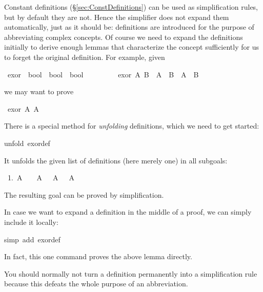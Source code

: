 \begin{isabelle}%
%
\begin{isamarkuptext}%
\noindent Constant definitions (\S\ref{sec:ConstDefinitions}) can
be used as simplification rules, but by default they are not.  Hence the
simplifier does not expand them automatically, just as it should be:
definitions are introduced for the purpose of abbreviating complex
concepts. Of course we need to expand the definitions initially to derive
enough lemmas that characterize the concept sufficiently for us to forget the
original definition. For example, given%
\end{isamarkuptext}%
\ exor\ {\isacharcolon}{\isacharcolon}\ {\isachardoublequote}bool\ {\isasymRightarrow}\ bool\ {\isasymRightarrow}\ bool{\isachardoublequote}\isanewline
\ \ \ \ \ \ \ \ \ {\isachardoublequote}exor\ A\ B\ {\isasymequiv}\ {\isacharparenleft}A\ {\isasymand}\ {\isasymnot}B{\isacharparenright}\ {\isasymor}\ {\isacharparenleft}{\isasymnot}A\ {\isasymand}\ B{\isacharparenright}{\isachardoublequote}%
\begin{isamarkuptext}%
\noindent
we may want to prove%
\end{isamarkuptext}%
\ {\isachardoublequote}exor\ A\ {\isacharparenleft}{\isasymnot}A{\isacharparenright}{\isachardoublequote}%
\begin{isamarkuptxt}%
\noindent
There is a special method for \emph{unfolding} definitions, which we need to
get started:%
\end{isamarkuptxt}%
unfold\ exor{\isacharunderscore}def{\isacharparenright}%
\begin{isamarkuptxt}%
\noindent
It unfolds the given list of definitions (here merely one) in all subgoals:
\begin{isabellepar}%
~1.~A~{\isasymand}~{\isasymnot}~{\isasymnot}~A~{\isasymor}~{\isasymnot}~A~{\isasymand}~{\isasymnot}~A%
\end{isabellepar}%
The resulting goal can be proved by simplification.

In case we want to expand a definition in the middle of a proof, we can
simply include it locally:%
\end{isamarkuptxt}%
simp\ add{\isacharcolon}\ exor{\isacharunderscore}def{\isacharparenright}%
\begin{isamarkuptext}%
\noindent
In fact, this one command proves the above lemma directly.

You should normally not turn a definition permanently into a simplification
rule because this defeats the whole purpose of an abbreviation.%
\end{isamarkuptext}%
\end{isabelle}%
